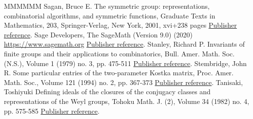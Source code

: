 \begin{thebibliography}{MMMMMM}
 Sagan, Bruce E. The symmetric group: representations, combinatorial algorithms, and symmetric functions, Graduate Texts in Mathematics, 203, Springer-Verlag, New York, 2001, xvi+238 pages \href{https://alco.centre-mersenne.org/articles/10.5802/alco.396/#Sagan}{Publisher reference}.
 Sage Developers, The SageMath (Version 9.0) (2020) \url{https://www.sagemath.org} \href{https://alco.centre-mersenne.org/articles/10.5802/alco.396/#sage}{Publisher reference}.
 Stanley, Richard P. Invariants of finite groups and their applications to combinatorics, Bull. Amer. Math. Soc. (N.S.), Volume 1 (1979) no. 3, pp. 475-511 \href{https://alco.centre-mersenne.org/articles/10.5802/alco.396/#Stanley}{Publisher reference}.
 Stembridge, John R. Some particular entries of the two-parameter Kostka matrix, Proc. Amer. Math. Soc., Volume 121 (1994) no. 2, pp. 367-373 \href{https://alco.centre-mersenne.org/articles/10.5802/alco.396/#Stembridge}{Publisher reference}.
 Tanisaki, Toshiyuki Defining ideals of the closures of the conjugacy classes and representations of the Weyl groups, Tohoku Math. J. (2), Volume 34 (1982) no. 4, pp. 575-585 \href{https://alco.centre-mersenne.org/articles/10.5802/alco.396/#Tanisaki}{Publisher reference}.
\end{thebibliography}
